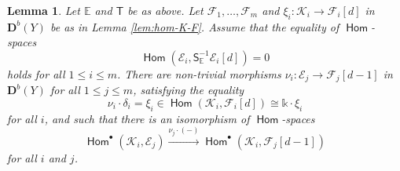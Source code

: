 \documentclass[a4paper,11pt, reqno]{amsart}
\def\E{\mathbb E}
\def\DD{\mathbf D}
\def\sE{\mathscr{E}}
\def\sF{\mathscr{F}}
\def\sK{\mathscr{K}}
\newcommand{\opname}[1]{\operatorname{\mathsf{#1}}}
\newcommand{\Hom}{\opname{Hom}}
\def\Db{\DD^b}
\newcommand{\bS}{\mathsf{S}}
\newcommand{\bT}{\mathsf{T}}
\theoremstyle{plain}
\newtheorem{lemma}[dummy]{Lemma}
\theoremstyle{definition}
\numberwithin{equation}{section}
\newlength{\arrow}
\begin{document}
\begin{lemma}\label{lem:nu-iso}
    Let $\E$ and $\bT$ be as above.
    Let $\sF_1  , \ldots , \sF_m $ and $\xi_i\colon \sK_i \to \sF_i [d] $ in $\Db(Y)$ be as in Lemma \ref{lem:hom-K-F}.
    Assume that the equality of $\Hom$-spaces
    \[
    \Hom ( \sE_i , \bS^{-1}_{\E} \sE_i [d] ) =0 
    \]
    holds for all $1\leq i \leq m$.
    There are non-trivial morphisms $\nu_i \colon \sE_j \to \sF_j [d-1]$ in $\Db(Y)$ for all $1\leq j \leq m$,
    satisfying the equality 
        \begin{equation}\label{eq:nu-def}
    \nu_i \cdot \delta_i = \xi_i \in  \Hom ( \sK_i , \sF_i [d] ) \cong \mathbb{k} \cdot \xi_i  
    \end{equation}
    for all $i$, and such that there is an isomorphism of $\Hom$-spaces
    \begin{equation}\label{eq:nu-iso}
         \Hom^\bullet ( \sK_i , \sE_j ) \xrightarrow{\nu_j \cdot (-)} \Hom^\bullet ( \sK_i , \sF_j  [d-1] )
    \end{equation}
        for all $i $ and $j$.
\end{lemma}
\end{document}
